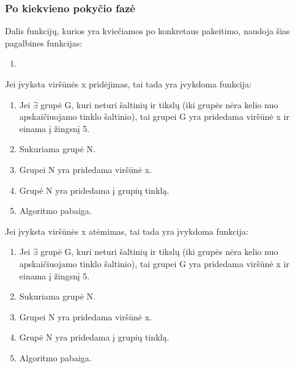\subsubsection{Po kiekvieno pokyčio fazė}

Dalis funkcijų, kurios yra kviečiamos po konkretaus pakeitimo, naudoja šias pagalbines funkcijas:


\begin{enumerate}
	\item 
\end{enumerate}

Jei įvyksta viršūnės x pridėjimas, tai tada yra įvykdoma funkcija:
\begin{enumerate}
	\item Jei $\exists$ grupė G, kuri neturi šaltinių ir tikslų (iki grupės nėra kelio nuo apskaičiuojamo tinklo šaltinio), tai grupei G yra pridedama viršūnė x ir einama į žingsnį 5.
	\item Sukuriama grupė N.
	\item Grupei N  yra pridedama viršūnė x.
	\item Grupė N  yra pridedama į grupių tinklą.
	\item Algoritmo pabaiga. 
\end{enumerate}

Jei įvyksta viršūnės x atėmimas, tai tada yra įvykdoma funkcija:
\begin{enumerate}
\item Jei $\exists$ grupė G, kuri neturi šaltinių ir tikslų (iki grupės nėra kelio nuo apskaičiuojamo tinklo šaltinio), tai grupei G yra pridedama viršūnė x ir einama į žingsnį 5.
\item Sukuriama grupė N.
\item Grupei N  yra pridedama viršūnė x.
\item Grupė N  yra pridedama į grupių tinklą.
\item Algoritmo pabaiga. 
\end{enumerate}